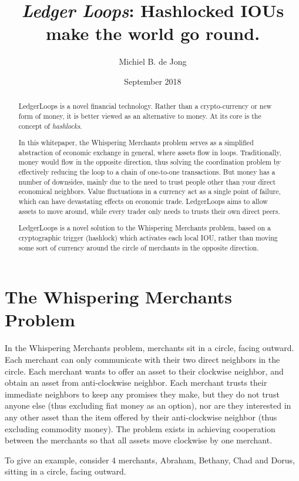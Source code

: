\documentclass[11pt,twoside,a4paper]{article}
\begin{document}
\title{{\em Ledger Loops}: Hashlocked IOUs make the world go round.}
\author{Michiel B. de Jong}
\date{September 2018}
\maketitle
\begin{abstract}
LedgerLoops is a novel financial technology. Ra\-ther than a cryp\-to-cur\-ren\-cy or new form of mo\-ney, it is better viewed as an alternative to money. At its core is the concept of {\em hashlocks}.

In this whitepaper, the Whispering Merchants problem serves as a simplified abstraction of economic exchange in general, where assets flow in loops. Traditionally, money would flow in the opposite direction, thus solving the coordination problem by effectively reducing the loop to a chain of one-to-one transactions. But money has a number of downsides, mainly due to the need to trust people other than your direct economical neighbors. Value fluctuations in a currency act as a single point of failure, which can have devastating effects on economic trade. LedgerLoops aims to allow assets to move around, while every trader only needs to trusts their own direct peers.

LedgerLoops is a novel solution to the Whispering Merchants problem, based on a cryptographic trigger (hashlock) which activates each local IOU, ra\-ther than mo\-ving some sort of currency around the circle of merchants in the opposite direction.
\end{abstract}

\section{The Whispering Merchants Problem}
In the Whispering Merchants problem, merchants sit in a circle, facing outward. Each merchant can only communicate with their two direct neighbors in the circle. Each merchant wants to offer an asset to their clockwise neighbor, and obtain an asset from anti-clockwise neighbor. Each merchant trusts their immediate neighbors to keep any promises they make, but they do not trust anyone else (thus excluding fiat money as an option), nor are they interested in any other asset than the item offered by their anti-clockwise neighbor (thus excluding commodity money). The problem exists in achieving cooperation between the merchants so that all assets move clockwise by one merchant.

To give an example, consider 4 merchants, Abraham, Bethany, Chad and Dorus, sitting in a circle, facing outward.
\end{document}
